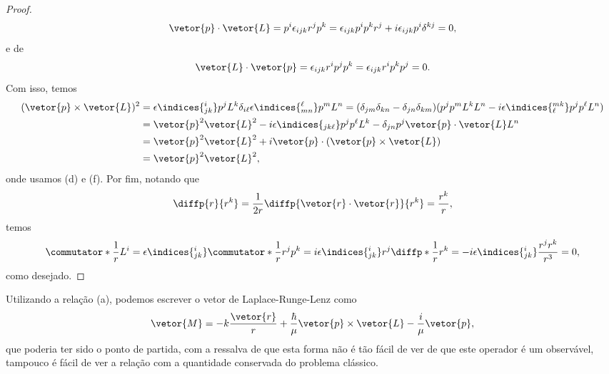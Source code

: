 \begin{proof}
   \begin{equation*}
      \vetor{p} \cdot \vetor{L} = p^i \epsilon_{ijk} r^j p^k = \epsilon_{ijk} p^i p^k r^j + i\epsilon_{ijk} p^i  \delta^{kj} = 0,
   \end{equation*}
   e de
   \begin{equation*}
      \vetor{L}\cdot\vetor{p} = \epsilon_{ijk} r^i p^j p^k = \epsilon_{ijk} r^i p^k p^j = 0.
   \end{equation*}
   Com isso, temos
   \begin{align*}
      (\vetor{p}\times\vetor{L})^2 &= \epsilon\indices{^i_{jk}} p^j L^k\delta_{i\ell} \epsilon\indices{^\ell_{mn}}p^m L^n = (\delta_{jm} \delta_{kn} - \delta_{jn}\delta_{km}) (p^j p^m L^k L^n - i \epsilon\indices{^{mk}_\ell}p^jp^\ell L^n)\\
                                   &= \vetor{p}^2 \vetor{L}^2 -i \epsilon\indices{_{jk\ell}}p^j p^\ell L^k - \delta_{jn}p^j \vetor{p}\cdot\vetor{L} L^n\\
                                   &= \vetor{p}^2 \vetor{L}^2 + i \vetor{p} \cdot (\vetor{p} \times \vetor{L}) \\
                                   &= \vetor{p}^2 \vetor{L}^2,
   \end{align*}
   onde usamos (d) e (f). Por fim, notando que
   \begin{equation*}
      \diffp{r}{r^k} = \frac1{2r}\diffp{\vetor{r} \cdot \vetor{r}}{r^k} = \frac{r^k}{r},
   \end{equation*}
   temos
   \begin{equation*}
      \commutator*{\frac{1}{r}}{L^i} = \epsilon\indices{^i_{jk}} \commutator*{\frac{1}{r}}{r^j p^k} = i\epsilon\indices{^i_{jk}} r^j \diffp*{\frac{1}{r}}{r^k} = -i\epsilon\indices{^i_{jk}} \frac{r^j r^k}{r^3} = 0,
   \end{equation*}
   como desejado.
\end{proof}

Utilizando a relação (a), podemos escrever o vetor de Laplace-Runge-Lenz como
\begin{equation*}
   \vetor{M} = -k\frac{\vetor{r}}{r} + \frac{\hbar}{\mu} \vetor{p} \times\vetor{L} - \frac{i}{\mu}\vetor{p},
\end{equation*}
que poderia ter sido o ponto de partida, com a ressalva de que esta forma não é tão fácil de ver de que este operador é um observável, tampouco é fácil de ver a relação com a quantidade conservada do problema clássico.

